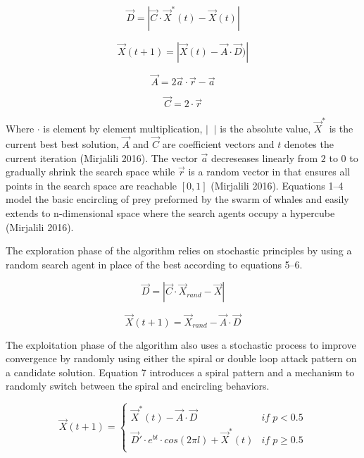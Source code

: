 \documentclass[11pt]{article}
\begin{document}
\begin{equation}
	\vec{D} = |\vec{C}\cdot\vec{X}^*(t) - \vec{X}(t)|
\end{equation}

\begin{equation}
	\vec{X}(t + 1) = |\vec{X}(t) - \vec{A}\cdot\vec{D})|
\end{equation}

\begin{equation}
	\vec{A} = 2\vec{a}\cdot\vec{r}-\vec{a}
\end{equation}

\begin{equation}
	\vec{C} = 2\cdot\vec{r}
\end{equation}

Where $\cdot$ is element by element multiplication, $| \;\; |$ is the absolute value, $\vec{X}^*$ is the current best best solution, $\vec{A}$ and $\vec{C}$ are coefficient vectors and $t$ denotes the current iteration (Mirjalili 2016).
The vector $\vec{a}$ decreseases linearly from $2$ to $0$ to gradually shrink the search space while $\vec{r}$ is a random vector in that ensures all points in the search space are reachable $[0,1]$ (Mirjalili 2016).
Equations 1--4 model the basic encircling of prey preformed by the swarm of whales and easily extends to n-dimensional space where the search agents occupy a hypercube (Mirjalili 2016).

The exploration phase of the algorithm relies on stochastic principles by using a random search agent in place of the best according to equations 5--6.

\begin{equation}
	\vec{D} = |\vec{C}\cdot\vec{X}_{rand} - \vec{X}|
\end{equation}

\begin{equation}
	\vec{X}(t+1) = \vec{X}_{rand} - \vec{A}\cdot\vec{D}
\end{equation}

The exploitation phase of the algorithm also uses a stochastic process to improve convergence by randomly using either the spiral or double loop attack pattern on a candidate solution.
Equation 7 introduces a spiral pattern and a mechanism to randomly switch between the spiral and encircling behaviors.

\begin{equation}
	\vec{X}(t+1) =
	\begin{cases}
		\vec{X}^*(t) - \vec{A}\cdot\vec{D} &if \; p < 0.5\\
		\vec{D}'\cdot e^{bl} \cdot cos(2\pi l) + \vec{X}^*(t) &if \; p \geq 0.5\\
   \end{cases}
\end{equation}
\end{document}

